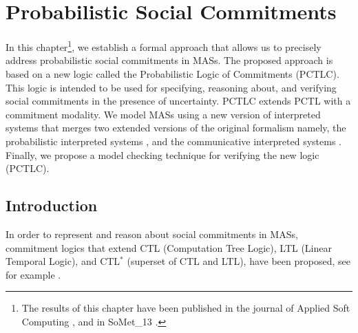 \setcounter{chapter}{2}


\chapter{Probabilistic Social Commitments}\label{cha:PCTLC}

In this chapter\footnote{The results of this chapter have been published in the journal of Applied Soft Computing \cite{Sultan2014a}, and in SoMet\_13 \cite{Sultan2013}.}, we establish a formal approach that allows us to precisely address probabilistic social commitments in MASs. The proposed approach is based on a new logic called the Probabilistic Logic of Commitments (PCTLC). This logic is intended to be used for specifying, reasoning about, and verifying social commitments in the presence of uncertainty.
PCTLC extends PCTL \cite{Hansson1994} with a commitment modality. We model MASs using a new version of interpreted systems that merges two extended versions of the original formalism namely, the probabilistic interpreted systems \cite{Halpern2003,Wan2013}, and the communicative interpreted systems \cite{Bentahar2012,El-Menshawy2013a}. Finally, we propose a model checking technique for verifying the new logic (PCTLC). %


\section{Introduction} \label{sec:introduction}

In order to represent and reason about social commitments in MASs,
commitment logics that extend CTL (Computation Tree Logic), LTL
(Linear Temporal Logic), and CTL$^{*}$ (superset of CTL and LTL),
have been proposed, see for example
\cite{Bentahar2004,Giordano2007,Pham2007,Singh2000,Verdicchio2003}.

